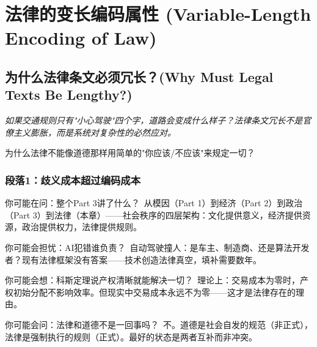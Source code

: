 \documentclass[a4paper,12pt]{book}
\newenvironment{motivation}{\begin{tcolorbox}[colback=gray!10,colframe=gray!60,title=\textit{动机}]\small\itshape}{\end{tcolorbox}}
\newenvironment{questionbox}{\begin{tcolorbox}[colback=red!3,colframe=red!60]}{\end{tcolorbox}}
\begin{document}
\begin{motivation}
\begin{motivation}
\begin{motivation}
	\section{法律的变长编码属性 (Variable-Length Encoding of Law)}

	\subsection{为什么法律条文必须冗长？(Why Must Legal Texts Be Lengthy?)}
	\begin{motivation}
		如果交通规则只有"小心驾驶"四个字，道路会变成什么样子？法律条文冗长不是官僚主义膨胀，而是系统对复杂性的必然应对。
	\end{motivation}
	\begin{questionbox}
		为什么法律不能像道德那样用简单的"你应该/不应该"来规定一切？
	\end{questionbox}

	\subsubsection*{段落1：歧义成本超过编码成本}

	\begin{tcolorbox}[colback=yellow!5, title=\textit{读者行为预测}]
		你可能在问：整个Part 3讲了什么？\ 从模因（Part 1）到经济（Part 2）到政治（Part 3）到法律（本章）——社会秩序的四层架构：文化提供意义，经济提供资源，政治提供权力，法律提供规则。
	\end{tcolorbox}


	\begin{tcolorbox}[colback=yellow!5, title=\textit{读者行为预测}]
		你可能会担忧：AI犯错谁负责？\ 自动驾驶撞人：是车主、制造商、还是算法开发者？现有法律框架没有答案——技术创造法律真空，填补需要数年。
	\end{tcolorbox}


	\begin{tcolorbox}[colback=yellow!5, title=\textit{读者行为预测}]
		你可能会想：科斯定理说产权清晰就能解决一切？\ 理论上：交易成本为零时，产权初始分配不影响效率。但现实中交易成本永远不为零——这才是法律存在的理由。
	\end{tcolorbox}


	\begin{tcolorbox}[colback=yellow!5, title=\textit{读者行为预测}]
		你可能会问：法律和道德不是一回事吗？\ 不。道德是社会自发的规范（非正式），法律是强制执行的规则（正式）。最好的状态是两者互补而非冲突。
	\end{tcolorbox}



\end{motivation}
\end{motivation}
\end{motivation}
\end{document}
